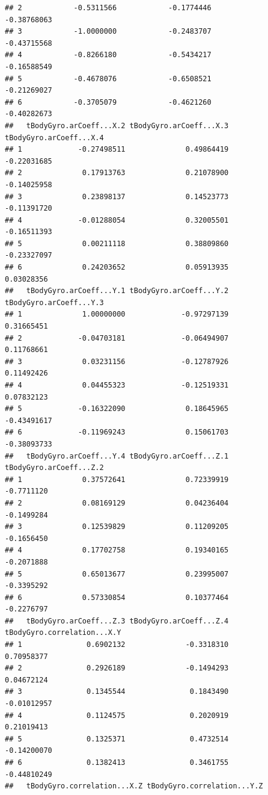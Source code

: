 \documentclass[
]{article}
\begin{document}
\begin{verbatim}
## 2            -0.5311566            -0.1774446             -0.38768063
## 3            -1.0000000            -0.2483707             -0.43715568
## 4            -0.8266180            -0.5434217             -0.16588549
## 5            -0.4678076            -0.6508521             -0.21269027
## 6            -0.3705079            -0.4621260             -0.40282673
##   tBodyGyro.arCoeff...X.2 tBodyGyro.arCoeff...X.3 tBodyGyro.arCoeff...X.4
## 1             -0.27498511              0.49864419             -0.22031685
## 2              0.17913763              0.21078900             -0.14025958
## 3              0.23898137              0.14523773             -0.11391720
## 4             -0.01288054              0.32005501             -0.16511393
## 5              0.00211118              0.38809860             -0.23327097
## 6              0.24203652              0.05913935              0.03028356
##   tBodyGyro.arCoeff...Y.1 tBodyGyro.arCoeff...Y.2 tBodyGyro.arCoeff...Y.3
## 1              1.00000000             -0.97297139              0.31665451
## 2             -0.04703181             -0.06494907              0.11768661
## 3              0.03231156             -0.12787926              0.11492426
## 4              0.04455323             -0.12519331              0.07832123
## 5             -0.16322090              0.18645965             -0.43491617
## 6             -0.11969243              0.15061703             -0.38093733
##   tBodyGyro.arCoeff...Y.4 tBodyGyro.arCoeff...Z.1 tBodyGyro.arCoeff...Z.2
## 1              0.37572641              0.72339919              -0.7711120
## 2              0.08169129              0.04236404              -0.1499284
## 3              0.12539829              0.11209205              -0.1656450
## 4              0.17702758              0.19340165              -0.2071888
## 5              0.65013677              0.23995007              -0.3395292
## 6              0.57330854              0.10377464              -0.2276797
##   tBodyGyro.arCoeff...Z.3 tBodyGyro.arCoeff...Z.4 tBodyGyro.correlation...X.Y
## 1               0.6902132              -0.3318310                  0.70958377
## 2               0.2926189              -0.1494293                  0.04672124
## 3               0.1345544               0.1843490                 -0.01012957
## 4               0.1124575               0.2020919                  0.21019413
## 5               0.1325371               0.4732514                 -0.14200070
## 6               0.1382413               0.3461755                 -0.44810249
##   tBodyGyro.correlation...X.Z tBodyGyro.correlation...Y.Z

\end{verbatim}
\end{document}
